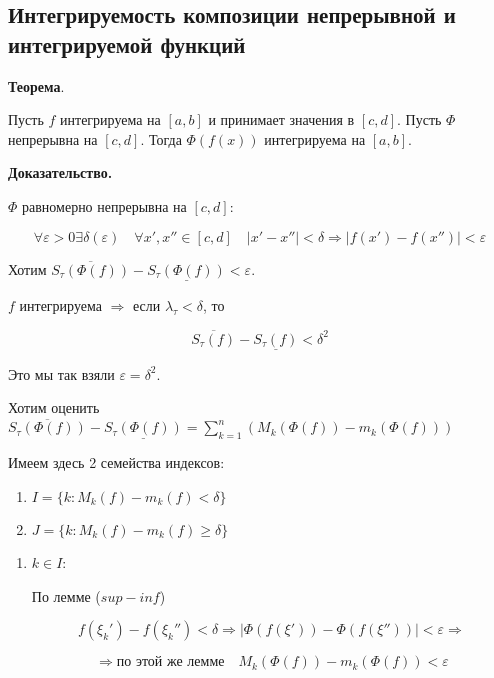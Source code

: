 \documentclass[a4paper]{article}
\begin{document}
\begin{definit}
\hypertarget{p10}{}
\subsection*{Интегрируемость композиции непрерывной и интегрируемой функций}

\begin{htheorem}\textbf{Теорема}.

Пусть $f$ интегрируема на $[a,b]$ и принимает значения в $[c,d]$. Пусть $\Phi$ непрерывна на $[c,d]$. Тогда $\Phi(f(x))$ интегрируема на $[a,b]$.
\end{htheorem}

\begin{hproof}\textbf{Доказательство.}

$\Phi$ равномерно непрерывна на $[c,d]$:

\[
\forall \varepsilon > 0 \exists \delta(\varepsilon) \quad \forall x', x'' \in [c,d] \quad |x'-x''| < \delta \Rightarrow |f(x')-f(x'')|<\varepsilon
\]

Хотим $\overline{S_\tau(\Phi(f))} - \underline{S_\tau(\Phi(f))} < \varepsilon$.

$f$ интегрируема $\Rightarrow$ если $\lambda_\tau < \delta$, то 

\[
\overline{S_\tau(f)} - \underline{S_\tau(f)} < \delta^2
\]

Это мы так взяли $\varepsilon = \delta^2$.

Хотим оценить $\overline{S_\tau(\Phi(f))} - \underline{S_\tau(\Phi(f))} = \sum_{k=1}^n (M_k(\Phi(f)) - m_k(\Phi(f)))$

Имеем здесь 2 семейства индексов:

\begin{enumerate}
\item $I = \{k: M_k(f) - m_k(f) < \delta \}$
\item $J = \{k: M_k(f) - m_k(f) \geq \delta \}$
\end{enumerate}


\begin{enumerate}
\item $k \in I$:

По лемме (\hyperlink{supinf}{$sup - inf$})

\[
f(\xi_k') - f(\xi_k'') < \delta \Rightarrow | \Phi(f(\xi')) - \Phi(f(\xi''))| < \varepsilon \Rightarrow
\]

\[
\Rightarrow \text{по этой же лемме} \quad M_k(\Phi(f)) - m_k(\Phi(f)) < \varepsilon
\]


\end{enumerate}
\end{hproof}
\end{definit}
\end{document}
